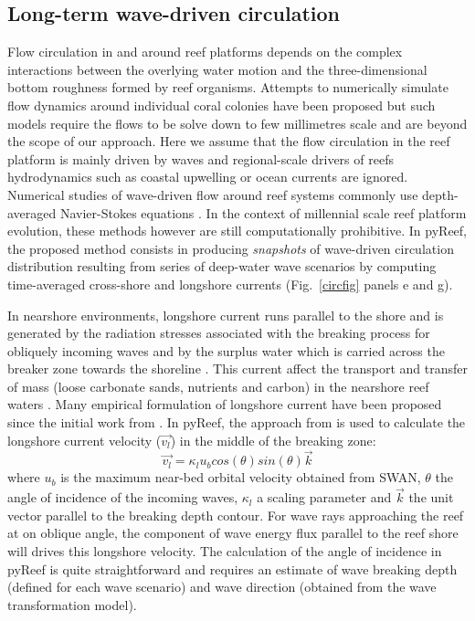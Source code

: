 \documentclass[default,jgrga]{agutex2015}
\begin{document}
\begin{article}
\subsection{Long-term wave-driven circulation}\label{seccirc}

Flow circulation in and around reef platforms depends on the complex interactions between the overlying water motion and the three-dimensional bottom roughness formed by reef organisms. Attempts to numerically simulate flow dynamics around individual coral colonies have been proposed \citep{Kaandorp03, Chang09, Chindapol13} but such models require the flows to be solve down to few millimetres scale and are beyond the scope of our approach. Here we assume that the flow circulation in the reef platform is mainly driven by waves and regional-scale drivers of reefs hydrodynamics such as coastal upwelling or ocean currents are ignored. Numerical studies of wave-driven flow around reef systems commonly use depth-averaged Navier-Stokes equations \citep{Raupach82, Symonds95, Lowe05, Lowe09, Pomeroy12, Taebi11}. In the context of millennial scale reef platform evolution, these methods however are still computationally prohibitive. In pyReef, the proposed method consists in producing \textit{snapshots} of wave-driven circulation distribution resulting from series of deep-water wave scenarios by computing time-averaged cross-shore and longshore currents (Fig.~\ref{circfig} panels e and g).

In nearshore environments, longshore current runs parallel to the shore and is generated by the radiation stresses associated with the breaking process for obliquely incoming waves and by the surplus water which is carried across the breaker zone towards the shoreline \citep{Longuet-Higgins70}. This current affect the transport and transfer of mass (loose carbonate sands, nutrients and carbon) in the nearshore reef waters \citep{Hamner88, Monismith07, Lowe15}. Many empirical formulation of longshore current have been proposed since the initial work from   \citet{Longuet-Higgins64}  \citep{Komar70, Komar75, Galvin87, Reniers97, Ruessink01, Grasmeijer03}. In pyReef, the approach from \citet{Komar75} is used to calculate the longshore current velocity ($\vec{v_l}$) in the middle of the breaking zone:
\begin{equation}
\vec{v_l} = \kappa_l u_{b} cos(\theta) sin(\theta) \vec{k}
\end{equation}
where $u_b$ is the maximum near-bed orbital velocity obtained from SWAN, $\theta$ the angle of incidence of the incoming waves, $\kappa_l$  a scaling parameter and $\vec{k}$ the unit vector parallel to the breaking depth contour. For wave rays approaching the reef at on oblique angle, the component of wave energy flux parallel to the reef shore will drives this longshore velocity. The calculation of the angle of incidence in pyReef is quite straightforward and requires an estimate of wave breaking depth (defined for each wave scenario) and wave direction (obtained from the wave transformation model).


\end{article}
\end{document}
